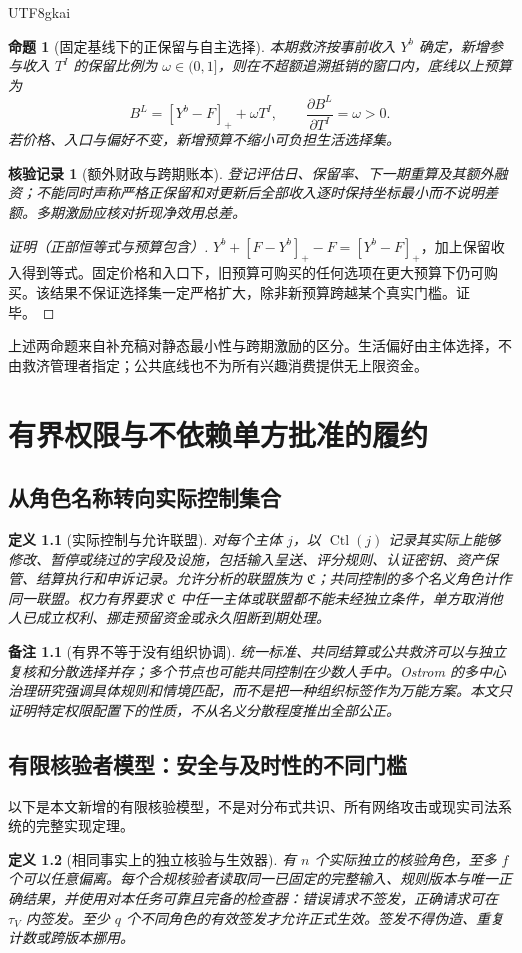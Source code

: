 \documentclass[12pt,a4paper,openany]{report}
\newtheorem{definition}{定义}[chapter]
\newtheorem{proposition}{命题}[chapter]
\newtheorem{remark}{备注}[chapter]
\newtheorem{Certificate}{核验记录}[chapter]
\begin{document}
\begin{CJK*}{UTF8}{gkai}
\begin{proposition}[固定基线下的正保留与自主选择]
\label{prop:retention}
本期救济按事前收入 $Y^b$ 确定，新增参与收入 $T^I$ 的保留比例为 $\omega\in(0,1]$，则在不超额追溯抵销的窗口内，底线以上预算为
\[
 B^L=[Y^b-F]_++\omega T^I,\qquad
 \frac{\partial B^L}{\partial T^I}=\omega>0.
\]
若价格、入口与偏好不变，新增预算不缩小可负担生活选择集。
\end{proposition}
\begin{Certificate}[额外财政与跨期账本]
登记评估日、保留率、下一期重算及其额外融资；不能同时声称严格正保留和对更新后全部收入逐时保持坐标最小而不说明差额。多期激励应核对折现净效用总差。
\end{Certificate}
\begin{proof}[证明（正部恒等式与预算包含）]
$Y^b+[F-Y^b]_+-F=[Y^b-F]_+$，加上保留收入得到等式。固定价格和入口下，旧预算可购买的任何选项在更大预算下仍可购买。该结果不保证选择集一定严格扩大，除非新预算跨越某个真实门槛。证毕。
\end{proof}
上述两命题来自补充稿对静态最小性与跨期激励的区分\cite{SourceSupplement}。生活偏好由主体选择，不由救济管理者指定；公共底线也不为所有兴趣消费提供无上限资金。
\chapter{有界权限与不依赖单方批准的履约}
\label{chap:power}
\section{从角色名称转向实际控制集合}
\begin{definition}[实际控制与允许联盟]
\label{def:control}
对每个主体 $j$，以 $\operatorname{Ctl}(j)$ 记录其实际上能够修改、暂停或绕过的字段及设施，包括输入呈送、评分规则、认证密钥、资产保管、结算执行和申诉记录。允许分析的联盟族为 $\mathfrak C$；共同控制的多个名义角色计作同一联盟。权力有界要求 $\mathfrak C$ 中任一主体或联盟都不能未经独立条件，单方取消他人已成立权利、挪走预留资金或永久阻断到期处理。
\end{definition}

\begin{remark}[有界不等于没有组织协调]
统一标准、共同结算或公共救济可以与独立复核和分散选择并存；多个节点也可能共同控制在少数人手中。Ostrom 的多中心治理研究强调具体规则和情境匹配，而不是把一种组织标签作为万能方案\cite{Ostrom2010}。本文只证明特定权限配置下的性质，不从名义分散程度推出全部公正。
\end{remark}

\section{有限核验者模型：安全与及时性的不同门槛}
以下是本文新增的有限核验模型，不是对分布式共识、所有网络攻击或现实司法系统的完整实现定理。
\begin{definition}[相同事实上的独立核验与生效器]
\label{def:validators}
有 $n$ 个实际独立的核验角色，至多 $f$ 个可以任意偏离。每个合规核验者读取同一已固定的完整输入、规则版本与唯一正确结果，并使用对本任务\emph{可靠且完备}的检查器：错误请求不签发，正确请求可在 $\tau_V$ 内签发。至少 $q$ 个不同角色的有效签发才允许正式生效。签发不得伪造、重复计数或跨版本挪用。


\end{definition}
\end{CJK*}
\end{document}
